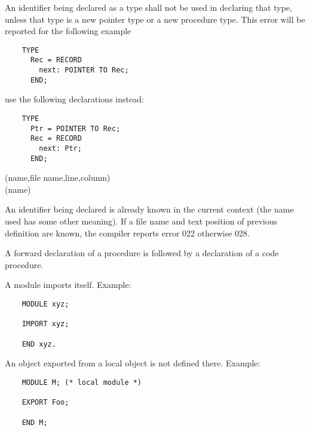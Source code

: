 An identifier being declared as a type shall not be used in declaring
that type, unless that type is a new pointer type or a new procedure
type. This error will be reported for the following example

\begin{verbatim}
    TYPE
      Rec = RECORD
        next: POINTER TO Rec;
      END;
\end{verbatim}

use the following declarations instead:

\begin{verbatim}
    TYPE
      Ptr = POINTER TO Rec;
      Rec = RECORD
        next: Ptr;
      END;
\end{verbatim}

(name,file name,line,column)\ifonline\else\\\fi
{}
(name)

An identifier being declared is already known in the current context
(the name used has some other meaning). If a file name and text
position of previous definition are known, the compiler reports error 022
otherwise 028.


A forward declaration of a procedure is followed by a declaration of a code
procedure.


A module imports itself. Example:

\begin{verbatim}
    MODULE xyz;

    IMPORT xyz;

    END xyz.
\end{verbatim}


An object exported from a local object is not defined there. Example:

\begin{verbatim}
    MODULE M; (* local module *)

    EXPORT Foo;

    END M;
\end{verbatim}


